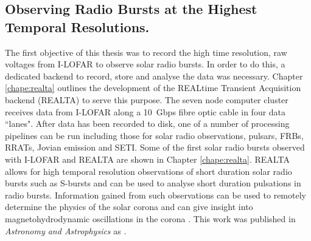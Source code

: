 \subsection{Observing Radio Bursts at the Highest Temporal Resolutions.}
The first objective of this thesis was to record the high time resolution, raw voltages from I-LOFAR to observe solar radio bursts.
In order to do this, a dedicated backend to record, store and analyse the data was necessary. Chapter \ref{chape:realta} outlines the development of the REALtime Transient Acquisition backend (REALTA) to serve this purpose. The seven node computer cluster receives data from I-LOFAR along a 10~Gbps fibre optic cable in four data ``lanes". After data has been recorded to disk, one of a number of processing pipelines can be run including those for solar radio observations, pulsars, FRBs, RRATs, Jovian emission and SETI. Some of the first solar radio bursts observed with I-LOFAR and REALTA are shown in Chapter \ref{chape:realta}. REALTA allows for high temporal resolution observations of short duration solar radio bursts such as S-bursts and can be used to analyse short duration pulsations in radio bursts. Information gained from such observations can be used to remotely determine the physics of the solar corona \citep{Morosan2015, Clarke2019} and can give insight into magnetohydrodynamic oscillations in the corona \citep{Carley2019}. This work was published in \textit{Astronomy and Astrophysics} as \cite{Murphy2021b}.

